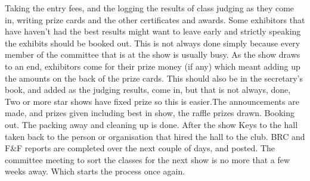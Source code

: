 \documentclass[a4paper,11pt]{report}
\begin{document}
Taking the entry fees, and the logging the results of class judging as they come in, writing prize cards and the other certificates and awards. Some exhibitors that have haven't had the best results might want to leave early and strictly speaking the exhibits should be booked out. This is not always done simply because every member of the committee that is at the show is usually busy. As the show draws to an end, exhibitors come for their prize money (if any) which meant adding up the amounts on the back of the prize cards. This should also be in the secretary's book, and added as the judging results, come in, but that is not always, done, Two or more star shows have fixed prize so this is easier.The announcements are made, and prizes given including best in show, the raffle prizes drawn. Booking out. The packing away and cleaning up is done.\newline \newline
After the show\newline \newline
Keys to the hall taken back to the person or organisation that hired the hall to the club. BRC and F\&F reports are completed over the next couple of days, and posted.\newline
The committee meeting to sort the classes for the next show is no more that a few weeks away. Which starts the process once again.\newpage 
\appendix
\end{document}
